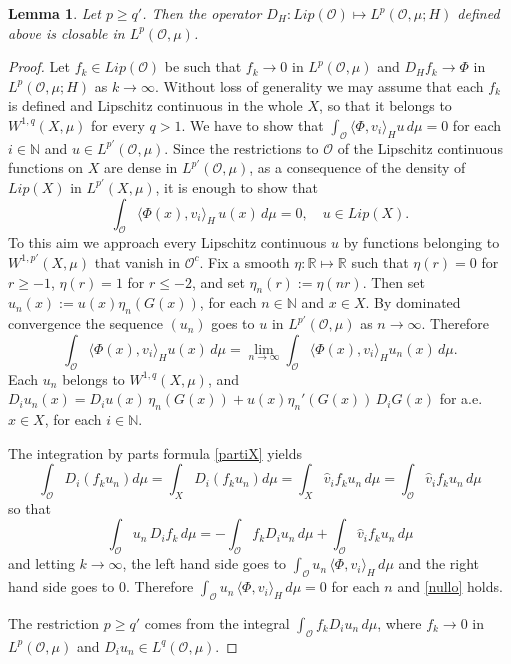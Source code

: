 \documentclass[reqno,twoside,12pt]{amsart}
\newtheorem{Lemma}[Theorem]{Lemma}
\begin{document}
\begin{Lemma}
\label{Le:chiusura}
Let $p\geq q'$. Then the operator $D_H: Lip ({\mathcal O})\mapsto L^p({\mathcal O}, \mu; H)$ defined above is closable in $L^p({\mathcal O}, \mu)$. 
\end{Lemma}
\begin{proof}
Let  $f_k \in Lip ({\mathcal O})$ be such that  $f_k\to 0$ in $L^p({\mathcal O}, \mu)$ and  $D_Hf_k\to \Phi$ in $L^p({\mathcal O}, \mu; H)$ as $k\to \infty$. Without loss of generality we may assume that each $f_k$ is defined and Lipschitz continuous in the whole $X$, so that it belongs to $W^{1,q}(X, \mu)$ for every $q>1$. 
We have to  show that  
$\int_{\mathcal O} \langle  \Phi, v_i\rangle_H u\,d\mu =0$ for each $i\in {\mathbb N}$ and  $u\in  L^{p'}({\mathcal O}, \mu)$. Since the restrictions to ${\mathcal O}$ of the Lipschitz continuous functions on $X$ are dense in $ L^{p'}({\mathcal O}, \mu)$, as a consequence of the density of  $Lip(X)$ in $L^{p'}(X, \mu)$, it is enough to show that 
\begin{equation}
\label{nullo}
\int_{\mathcal O} \langle \Phi(x), v_i\rangle_H\, u(x)\,d\mu =0, \quad u\in  Lip(X).
\end{equation}
To this aim we approach every Lipschitz continuous $u$ by functions belonging to $W^{1,p'}(X,\mu)$ that vanish in ${\mathcal O}^c$. 
Fix a smooth $\eta:{\mathbb R} \mapsto {\mathbb R}$ such that  $\eta(r) =0$ for $r\geq -1$, $\eta(r) =1$ for $r\leq -2$, and set   $\eta_n(r):= \eta (nr)$. Then set $u_n(x) := u(x)\eta_n(G (x))$, for each  $n\in {\mathbb N}$ and $x\in X$. By dominated convergence the sequence  $(u_n)$ goes to  $u$ in $L^{p'}({\mathcal O}, \mu)$ as $n\to \infty$. Therefore 
$$\int_{\mathcal O} \langle \Phi(x), v_i\rangle_H  u(x)\,d\mu = \lim_{n\to \infty} \int_{\mathcal O}  \langle \Phi(x), v_i\rangle_H u_n(x)\,d\mu .$$
Each  $u_n$ belongs to $W^{1,q}(X, \mu)$, and  $D_iu_n(x) = D_iu(x) \,\eta_n( G(x)) + u(x)\eta_n'(G(x))\,D_iG(x)$ for a.e. $x\in  X$,  for each  $i\in {\mathbb N}$. 

The integration by parts formula  \eqref{partiX}  yields
$$\int_{\mathcal O} D_i(f_ku_n) d\mu = \int_{X} D_i(f_ku_n) d\mu =   \int_{X} \hat{v}_i f_ku_n\,d\mu=    \int_{\mathcal O}\hat{v}_i f_ku_n\,d\mu$$
so that 
$$\int_{\mathcal O} u_n \,D_if_k\,d\mu = -\int_{\mathcal O} f_kD_iu_n\,d\mu +   \int_{\mathcal O} \hat{v}_i f_ku_n\, d\mu$$
and letting   $k\to \infty$, the left hand side goes to $\int_{\mathcal O} u_n \, \langle \Phi, v_i\rangle_H\,  d\mu$ and the right hand side goes to $0$. Therefore $\int_{\mathcal O} u_n \, \langle \Phi, v_i\rangle_H\, d\mu =0$ for each  $n$ and  \eqref{nullo} holds. 

The restriction $p\geq q'$ comes from the integral $\int_{\mathcal O} f_kD_iu_n\,d\mu$, where $f_k\to 0$ in $L^p({\mathcal O}, \mu)$ and $D_iu_n\in  L^q({\mathcal O}, \mu)$. 
 \end{proof}
\end{document}

